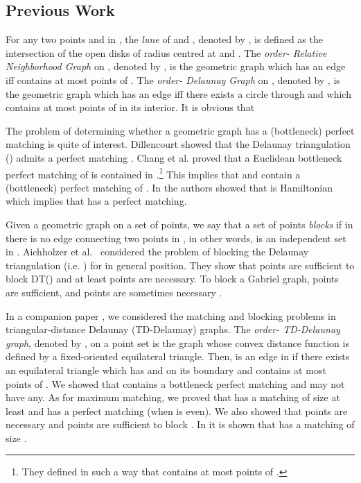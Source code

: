 \documentclass[11pt,a4paper]{article}
\newcommand{\kTD}[2]{}
\newcommand{\kDG}[2]{}
\newcommand{\kGG}[2]{}
\newcommand{\kRNG}[2]{}
\begin{document}
\subsection{Previous Work}
For any two points  and  in , the {\em lune} of  and , denoted by , is defined as the intersection of the open disks of radius  centred at  and .
The {\em order- Relative Neighborhood Graph} on , denoted by \kRNG{k}{}, is the geometric graph which has an edge  iff  contains at most  points of .  
The {\em order- Delaunay Graph} on , denoted by \kDG{k}{}, is the geometric graph which has an edge  iff there exists a circle through  and  which contains at most  points of  in its interior. 
It is obvious that 

The problem of determining whether a geometric graph has a (bottleneck) perfect matching is quite of interest. Dillencourt showed that the Delaunay triangulation (\kDG{0}{}) admits a perfect matching \cite{Dillencourt1990}. Chang et al. \cite{Chang1992} proved that a Euclidean bottleneck perfect matching of  is contained in \kRNG{16}{}.\footnote{They defined \kRNG{k}{} in such a way that  contains at most  points of .} This implies that \kGG{16}{} and \kDG{16}{} contain a (bottleneck) perfect matching of . In \cite{Abellanas2009} the authors showed that \kGG{15}{} is Hamiltonian which implies that \kGG{15}{} has a perfect matching. 

Given a geometric graph  on a set  of  points, we say that a set  of points {\em blocks}  if in  there is no edge connecting two points in , in other words,  is an independent set in .
Aichholzer et al.~\cite{Aichholzer2013} considered the problem of blocking the Delaunay triangulation (i.e. \kDG{0}{}) for  in general position. They show that  points are sufficient to block DT() and at least  points are necessary. To block a Gabriel graph,  points are sufficient, and  points are sometimes necessary \cite{Aronov2013}.

In a companion paper \cite{Biniaz2014}, we considered the matching and blocking problems in triangular-distance Delaunay (TD-Delaunay) graphs. The {\em order- TD-Delaunay graph}, denoted by \kTD{k}{}, on a point set  is the graph whose convex distance function is
defined by a fixed-oriented equilateral triangle. Then,  is an edge in \kTD{k}{} if there exists an equilateral triangle which has  and  on its boundary and contains at most  points of . We showed that \kTD{6}{} contains a bottleneck perfect matching and \kTD{5}{} may not have any. As for maximum matching, we proved that \kTD{1}{} has a matching of size at least  and \kTD{2}{} has a perfect matching (when  is even). We also showed that  points are necessary and  points are sufficient to block \kTD{0}{}. In \cite{Babu2013} it is shown that \kTD{0}{} has a matching of size . 
\end{document}

